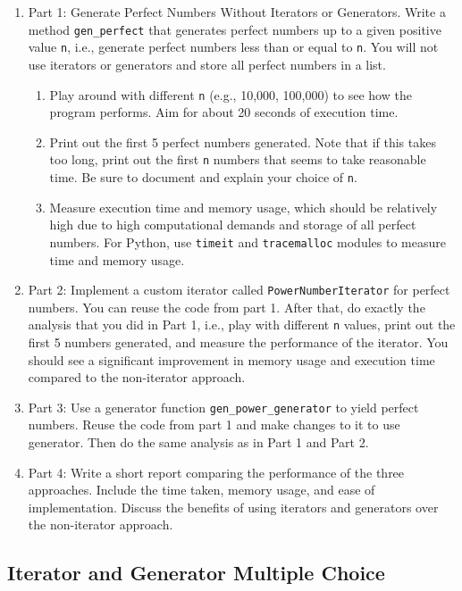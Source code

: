 \documentclass[oneside,11pt,dvipsnames]{book}
\newcommand{\code}[1]{\texttt{#1}}
\begin{document}
\begin{enumerate}
\item Part 1: Generate Perfect Numbers Without Iterators or Generators.  Write a method \code{gen\_perfect} that generates perfect numbers up to a given positive value \code{n}, i.e., generate perfect numbers less than or equal to \code{n}.  You will not use iterators or generators and store all perfect numbers in a list.
\begin{enumerate}
    \item Play around with different \code{n} (e.g., 10,000, 100,000) to see how the program performs. Aim for about 20 seconds of execution time.
    \item Print out the first 5 perfect numbers generated. Note that if this takes too long, print out the first \code{n} numbers that seems to take reasonable time.  Be sure to document and explain your choice of \code{n}.
    \item Measure execution time and memory usage, which should be relatively high due to high computational demands and storage of all perfect numbers.  For Python, use \code{timeit} and \code{tracemalloc} modules to measure time and memory usage.
\end{enumerate}

\item Part 2: Implement a custom iterator called \code{PowerNumberIterator} for perfect numbers. You can reuse the code from part 1.  After that, do exactly the analysis that you did in Part 1, i.e., play with different \code{n} values, print out the first 5 numbers generated, and measure the performance of the iterator.  You should see a significant improvement in memory usage and execution time compared to the non-iterator approach.
\item Part 3: Use a generator function \code{gen\_power\_generator} to yield perfect numbers.  Reuse the code from part 1 and make changes to it to use generator.  Then do the same analysis as in Part 1 and Part 2.
\item Part 4: Write a short report comparing the performance of the three approaches.  Include the time taken, memory usage, and ease of implementation.  Discuss the benefits of using iterators and generators over the non-iterator approach.
\end{enumerate}

\subsection{Iterator and Generator Multiple Choice}\label{exercise:iterator-generator-mc}
\end{document}
